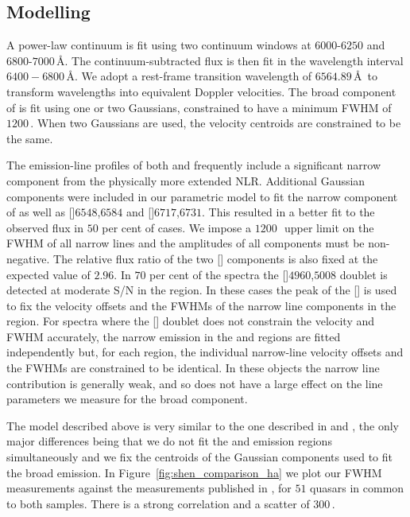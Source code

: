 \subsection{Modelling \ha}
\label{sec:ha}

A power-law continuum is fit using two continuum windows at $6000$-$6250$ and $6800$-$7000$\,\AA. 
The continuum-subtracted flux is then fit in the wavelength interval $6400-6800$\,\AA. 
We adopt a rest-frame transition wavelength of $6564.89$\,\AA\, to transform wavelengths into equivalent Doppler velocities. 
The broad component of \ha is fit using one or two Gaussians, constrained to have a minimum FWHM of $1200$\,\kms. When two Gaussians are used, the velocity centroids are constrained to be the same.

The emission-line profiles of both \hb and \ha frequently include a significant narrow component from the physically more extended NLR. 
Additional Gaussian components were included in our parametric model to fit the narrow component of \ha as well as []\ll$6548$,$6584$ and []\ll$6717$,$6731$.
This resulted in a better fit to the observed flux in $50$ per cent of cases. 
We impose a $1200$\,\kms\, upper limit on the FWHM of all narrow lines and the amplitudes of all components must be non-negative.
The relative flux ratio of the two [] components is also fixed at the expected value of $2.96$.
In $70$ per cent of the spectra the []\ll$4960$,$5008$ doublet is detected at moderate S/N in the \hb region. 
In these cases the peak of the [] is used to fix the velocity offsets and the FWHMs of the narrow line components in the \ha region.  
For spectra where the [] doublet does not constrain the velocity and FWHM accurately, the narrow emission in the \ha and \hb regions are fitted independently but, for each region, the individual narrow-line velocity offsets and the FWHMs are constrained to be identical. 
In these objects the narrow line contribution is generally weak, and so does not have a large effect on the line parameters we measure for the broad component.   

The model described above is very similar to the one described in \citet{shen12} and \citet{shen11}, the only major differences being that we do not fit the \ha and \hb emission regions simultaneously and we fix the centroids of the Gaussian components used to fit the broad emission.
In Figure~\ref{fig:shen_comparison_ha} we plot our \ha FWHM measurements against the measurements published in \citet{shen12}, for $51$ quasars in common to both samples.
There is a strong correlation and a scatter of $300$\,\kms. 

